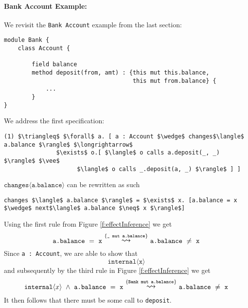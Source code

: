 \documentclass[12pt]{article}
\newcommand\trans[1]{\overset{#1}{\mathlarger{\mathlarger \leadsto}}}
\begin{document}
\paragraph{Bank Account Example:} We revisit the \texttt{Bank Account} example from the last section:
\begin{lstlisting}[mathescape=true]
module Bank {
	class Account {
	
		field balance
		method deposit(from, amt) : {this mut this.balance, 
		                             this mut from.balance} {
			...
		}
}
\end{lstlisting}
We address the first specification:
\begin{lstlisting}[mathescape=true]
(1) $\triangleq$ $\forall$ a. [ a : Account $\wedge$ changes$\langle$ a.balance $\rangle$ $\longrightarrow$
               $\exists$ o.[ $\langle$ o calls a.deposit(_, _) $\rangle$ $\vee$
                     $\langle$ o calls _.deposit(a, _) $\rangle$ ] ] 
\end{lstlisting}
$\texttt{changes}\langle \texttt{a.balance} \rangle$ can be rewritten as  such
\begin{lstlisting}[mathescape=true] 
changes $\langle$ a.balance $\rangle$ = $\exists$ x. [a.balance = x $\wedge$ next$\langle$ a.balance $\neq$ x $\rangle$]
\end{lstlisting}
Using the first rule from Figure \ref{f:effectInference} we get 
$$\texttt{a.balance}\ =\ \texttt{x}\ \trans{\{\texttt{\_ mut a.balance}\}} \ \texttt{a.balance}\ \neq\ \texttt{x}$$
Since \texttt{a : Account}, we are able to show that 
$$\texttt{internal}\langle \texttt{x} \rangle$$
and subsequently by the third rule in Figure \ref{f:effectInference} we get
$$\texttt{internal}\langle x \rangle\ \wedge\  \texttt{a.balance}\ =\ \texttt{x}\ \trans{\{\texttt{Bank mut a.balance}\}} \ \texttt{a.balance}\ \neq\ \texttt{x}$$
It then follows that there must be some call to \texttt{deposit}.
\end{document}
